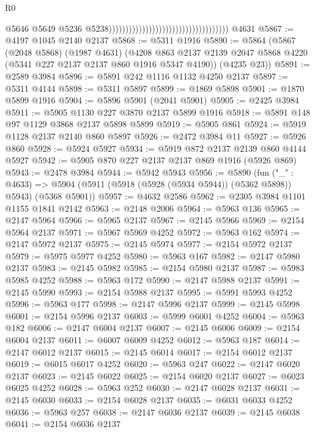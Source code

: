\begin{lexlean}{R0}
\begin{coremodule}
                                                                            @5646
                                                                            @5649
                                                                            @5236
                                                                            @5238))))))))))))))))))))))))))))))))))))
    @4631
@5867 := @4197 @1045 @2140 @2137
@5868 := @5311 @1916
@5890 := @5864
    (@5867
      (@2048 @5868)
      (@1987 @4631)
      (@4208 @863 @2137 @2139 @2047 @5868 @4220 (@5341 @227 @2137 @2137 @860 @1916 @5347 @4190))
      (@4235 @23))
@5891 := @2589 @3984
@5896 := @5891 @242 @1116 @1132 @4250 @2137
@5897 := @5311 @4144
@5898 := @5311 @5897
@5899 := @1869 @5898
@5901 := @1870 @5899 @1916
@5904 := @5896 @5901 (@2041 @5901)
@5905 := @2425 @3984
@5911 := @5905 @1130 @227 @3870 @2137 @5899 @1916
@5918 := @5891 @148 @97 @1129 @3868 @2137 @5898 @5899
@5919 := @5905 @861
@5924 := @5919 @1128 @2137 @2140 @860 @5897
@5926 := @2472 @3984 @11
@5927 := @5926 @860
@5928 := @5924 @5927
@5934 := @5919 @872 @2137 @2139 @860 @4144 @5927
@5942 := @5905 @870 @227 @2137 @2137 @869 @1916 (@5926 @869)
@5943 := @2478 @3984
@5944 := @5942 @5943
@5956 := @5890
    (fun ("_" : @4633) =>
    @5904 (@5911 (@5918 (@5928 (@5934 @5944)) (@5362 @5898)) @5943) (@5368 @5901))
@5957 := @4632 @2586
@5962 := @2305 @3984 @1101 @1155 @1841 @2142
@5963 := @2148 @2006
@5964 := @5963 @136
@5965 := @2147 @5964
@5966 := @5965 @2137
@5967 := @2145 @5966
@5969 := @2154 @5964 @2137
@5971 := @5967 @5969 @4252
@5972 := @5963 @162
@5974 := @2147 @5972 @2137
@5975 := @2145 @5974
@5977 := @2154 @5972 @2137
@5979 := @5975 @5977 @4252
@5980 := @5963 @167
@5982 := @2147 @5980 @2137
@5983 := @2145 @5982
@5985 := @2154 @5980 @2137
@5987 := @5983 @5985 @4252
@5988 := @5963 @172
@5990 := @2147 @5988 @2137
@5991 := @2145 @5990
@5993 := @2154 @5988 @2137
@5995 := @5991 @5993 @4252
@5996 := @5963 @177
@5998 := @2147 @5996 @2137
@5999 := @2145 @5998
@6001 := @2154 @5996 @2137
@6003 := @5999 @6001 @4252
@6004 := @5963 @182
@6006 := @2147 @6004 @2137
@6007 := @2145 @6006
@6009 := @2154 @6004 @2137
@6011 := @6007 @6009 @4252
@6012 := @5963 @187
@6014 := @2147 @6012 @2137
@6015 := @2145 @6014
@6017 := @2154 @6012 @2137
@6019 := @6015 @6017 @4252
@6020 := @5963 @247
@6022 := @2147 @6020 @2137
@6023 := @2145 @6022
@6025 := @2154 @6020 @2137
@6027 := @6023 @6025 @4252
@6028 := @5963 @252
@6030 := @2147 @6028 @2137
@6031 := @2145 @6030
@6033 := @2154 @6028 @2137
@6035 := @6031 @6033 @4252
@6036 := @5963 @257
@6038 := @2147 @6036 @2137
@6039 := @2145 @6038
@6041 := @2154 @6036 @2137

\end{coremodule}
\end{lexlean}
